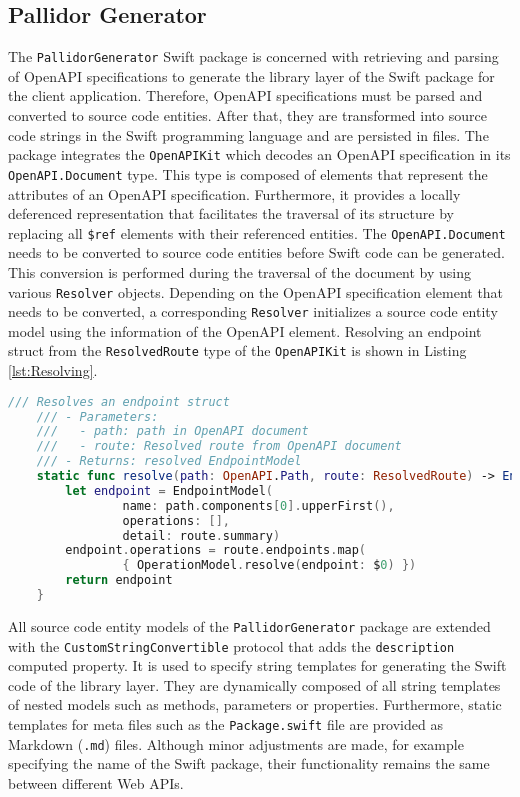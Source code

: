 \subsection{Pallidor Generator}\label{subsec:PallidorGenerator}

The \texttt{PallidorGenerator} Swift package is concerned with retrieving and parsing of OpenAPI specifications to generate the library layer of the Swift package for the client application. Therefore, OpenAPI specifications must be parsed and converted to source code entities. After that, they are transformed into source code strings in the Swift programming language and are persisted in files. The package integrates the \texttt{OpenAPIKit} which decodes an OpenAPI specification in its \texttt{Open\-API.Document} type. This type is composed of elements that represent the attributes of an OpenAPI specification. Furthermore, it provides a locally deferenced representation that facilitates the traversal of its structure by replacing all \texttt{\$ref} elements with their referenced entities. The \texttt{OpenAPI.Document} needs to be converted to source code entities before Swift code can be generated. This conversion is performed during the traversal of the document by using various \texttt{Resolver} objects. Depending on the OpenAPI specification element that needs to be converted, a corresponding \texttt{Resolver} initializes a source code entity model using the information of the OpenAPI element. Resolving an endpoint struct from the \texttt{Resolved\-Route} type of the \texttt{OpenAPIKit} is shown in Listing \ref{lst:Resolving}.

\begin{lstlisting}[language=Swift, caption={Resolving an operation}, captionpos=b, label={lst:Resolving}]
	/// Resolves an endpoint struct
	/// - Parameters:
	///   - path: path in OpenAPI document
	///   - route: Resolved route from OpenAPI document
	/// - Returns: resolved EndpointModel
	static func resolve(path: OpenAPI.Path, route: ResolvedRoute) -> EndpointModel {
		let endpoint = EndpointModel(
				name: path.components[0].upperFirst(), 
				operations: [], 
				detail: route.summary)
		endpoint.operations = route.endpoints.map( 
				{ OperationModel.resolve(endpoint: $0) })
		return endpoint
	}

\end{lstlisting}

All source code entity models of the \texttt{PallidorGenerator} package are extended with the \texttt{Custom\-String\-Convertible} protocol that adds the \texttt{description} computed property. It is used to specify string templates for generating the Swift code of the library layer. They are dynamically composed of all string templates of nested models such as methods, parameters or properties. Furthermore, static templates for meta files such as the \texttt{Package.swift} file are provided as Markdown (\texttt{.md}) files. Although minor adjustments are made, for example specifying the name of the Swift package, their functionality remains the same between different Web APIs.

